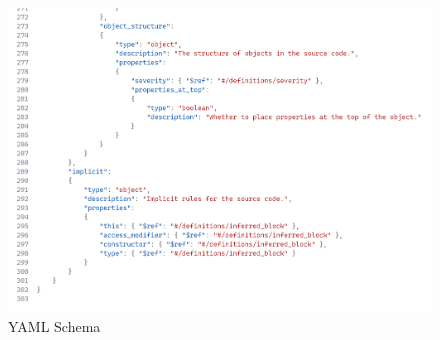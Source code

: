 \begin{figure}
{\begin{minipage}[t]{0.6\linewidth}
    \end{minipage}
    \begin{minipage}[t]{0.65\linewidth}
        \vspace{-75px}
        \centering
        \caption{YAML Schema}
        \label{fig:YAMLSchema}
        \includegraphics[width=\linewidth, height=\textheight, keepaspectratio]{Figures/YAMLSchemaCropped.png}
    \end{minipage}
}
\end{figure}




